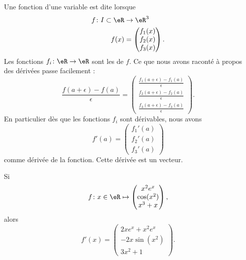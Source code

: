 Une fonction d'une variable est dite  lorsque
\begin{equation}
    \begin{aligned}
        f\colon I\subset \eR&\to \eR^3 \\
        f(x)&=\begin{pmatrix}
            f_1(x)    \\ 
            f_2(x)    \\ 
            f_3(x)    
        \end{pmatrix}.
    \end{aligned}
\end{equation}
Les fonctions $f_i\colon \eR\to \eR$ sont les  de $f$. Ce que nous avons raconté à propos des dérivées passe facilement :
\begin{equation}
    \frac{ f(a+\epsilon)-f(a) }{ \epsilon }=
    \begin{pmatrix}
        \frac{ f_1(a+\epsilon)-f_1(a) }{ \epsilon }    \\ 
        \frac{ f_2(a+\epsilon)-f_2(a) }{ \epsilon }    \\ 
        \frac{ f_3(a+\epsilon)-f_3(a) }{ \epsilon }    
    \end{pmatrix}.
\end{equation}
En particulier dès que les fonctions $f_i$ sont dérivables, nous avons
\begin{equation}
    f'(a)=\begin{pmatrix}
        f_1'(a)    \\ 
        f_2'(a)    \\ 
        f_3'(a)    
    \end{pmatrix}
\end{equation}
comme dérivée de la fonction. Cette dérivée est un vecteur.

\begin{example}
    Si
    \begin{equation}
        f\colon x\in\eR\mapsto \begin{pmatrix}
            x^2 e^{x}    \\ 
            \cos(x^2)    \\ 
            x^3+x    
        \end{pmatrix},
    \end{equation}
    alors
    \begin{equation}
        f'(x)=\begin{pmatrix}
            2xe^x+x^2e^x    \\ 
            -2x\sin(x^2)    \\ 
            3x^2+1    
        \end{pmatrix}.
    \end{equation}
\end{example}

